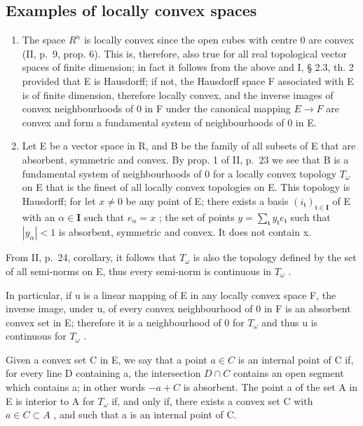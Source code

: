 \subsection{Examples of locally convex spaces}

\begin{enumerate}
\def\labelenumi{\arabic{enumi})}
\item
  The space \(R^{n}\) is locally convex since the open cubes with centre 0 are convex (II, p.~9, prop. 6). This is, therefore, also true for all real topological vector spaces of finite dimension; in fact it follows from the above and I, § 2.3, th. 2 provided that E is Hausdorff; if not, the Hausdorff space F associated with E is of finite dimension, therefore locally convex, and the inverse images of convex neighbourhoods of 0 in F under the canonical mapping \(E \rightarrow F\) are convex and form a fundamental system of neighbourhoods of 0 in E.
\item
  Let E be a vector space in R, and B be the family of all subsets of E that are absorbent, symmetric and convex. By prop. 1 of II, p.~23 we see that B is a fundamental system of neighbourhoods of 0 for a locally convex topology \(T_{\omega}\) on E that is the finest of all locally convex topologies on E. This topology is Hausdorff; for let \(x \neq 0\) be any point of E; there exists a basis \((i_{\mathfrak{t}})_{\mathfrak{t} \in \mathbf{I}}\) of E with an \(\alpha \in \mathbf{I}\) such that \(e_{\alpha} = x\) ; the set of points \(y = \sum_{\mathfrak{t}} y_{\mathfrak{t}} e_{\mathfrak{t}}\) such that \(|y_{\alpha}| < 1\) is absorbent, symmetric and convex. It does not contain x.
\end{enumerate}

From II, p.~24, corollary, it follows that \(T_{\omega}\) is also the topology defined by the set of all semi-norms on E, thus every semi-norm is continuous in \(T_{\omega}\) .

In particular, if u is a linear mapping of E in any locally convex space F, the inverse image, under u, of every convex neighbourhood of 0 in F is an absorbent convex set in E; therefore it is a neighbourhood of 0 for \(T_{\omega}\) and thus u is continuous for \(T_{\omega}\) .

Given a convex set C in E, we say that a point \(a \in C\) is an internal point of C if, for every line D containing a, the intersection \(D \cap C\) contains an open segment which contains a; in other words \(-a + C\) is absorbent. The point a of the set A in E is interior to A for \(T_{\omega}\) if, and only if, there exists a convex set C with \(a \in C \subset A\) , and such that a is an internal point of C.

